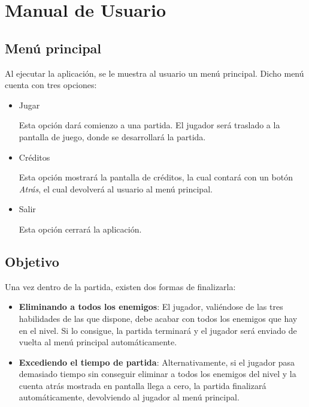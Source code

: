 \chapter{Manual de Usuario}

	\section{Menú principal}

		Al ejecutar la aplicación, se le muestra al usuario un menú principal. Dicho menú cuenta con tres opciones:

		\begin{itemize}

			\item Jugar

				Esta opción dará comienzo a una partida. El jugador será traslado a la pantalla de juego, donde se desarrollará la partida.

			\item Créditos

				Esta opción mostrará la pantalla de créditos, la cual contará con un botón \textit{Atrás}, el cual devolverá al usuario al menú principal.

			\item Salir

				Esta opción cerrará la aplicación.

		\end{itemize}

	\section{Objetivo}

		Una vez dentro de la partida, existen dos formas de finalizarla:

		\begin{itemize}		

			\item \textbf{Eliminando a todos los enemigos}: El jugador, valiéndose de las tres habilidades de las que dispone, debe acabar con todos los enemigos que hay en el nivel. Si lo consigue, la partida terminará y el jugador será enviado de vuelta al menú principal automáticamente.

			\item \textbf{Excediendo el tiempo de partida}: Alternativamente, si el jugador pasa demasiado tiempo sin conseguir eliminar a todos los enemigos del nivel y la cuenta atrás mostrada en pantalla llega a cero, la partida finalizará automáticamente, devolviendo al jugador al menú principal.

		\end{itemize}

